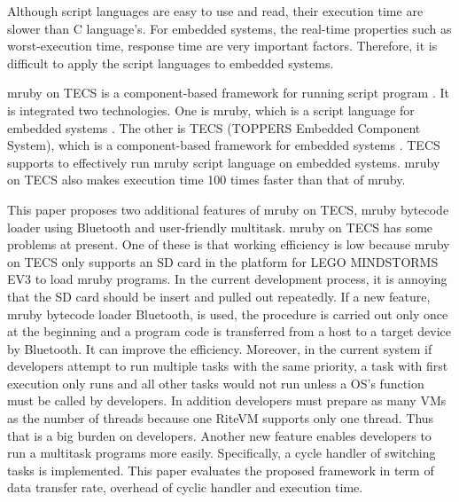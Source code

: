 \documentclass[conference,compsoc]{IEEEtran}
\begin{document}
Although script languages are easy to use and read, their execution time are slower than C language's.
For embedded systems, the real-time properties such as worst-execution time, response time are very important factors.
Therefore, it is difficult to apply the script languages to embedded systems.

mruby on TECS is a component-based framework for running script program \cite{7153813}.
It is integrated two technologies.
One is mruby, which is a script language for embedded systems \cite{5959588}.
The other is TECS (TOPPERS Embedded Component System), which is a component-based framework for embedded systems \cite{4208825}.
TECS supports to effectively run mruby script language on embedded systems.
mruby on TECS also makes execution time 100 times faster than that of mruby.

This paper proposes two additional features of mruby on TECS, mruby bytecode loader using Bluetooth and user-friendly multitask.
mruby on TECS has some problems at present.
One of these is that working efficiency is low because mruby on TECS only supports an SD card in the platform for LEGO MINDSTORMS EV3 to load mruby programs.
In the current development process, it is annoying that the SD card should be insert and pulled out repeatedly.
If a new feature, mruby bytecode loader Bluetooth, is used, the procedure is carried out only once at the beginning and a program code is transferred from a host to a target device by Bluetooth.
It can improve the efficiency.
Moreover, in the current system if developers attempt to run multiple tasks with the same priority, a task with first execution only runs and all other tasks would not run unless a OS's function must be called by developers.
In addition developers must prepare as many VMs as the number of threads because one RiteVM supports only one thread.
Thus that is a big burden on developers.
Another new feature enables developers to run a multitask programs more easily.
Specifically, a cycle handler of switching tasks is implemented.
This paper evaluates the proposed framework in term of data transfer rate, overhead of cyclic handler and execution time.
\end{document}
